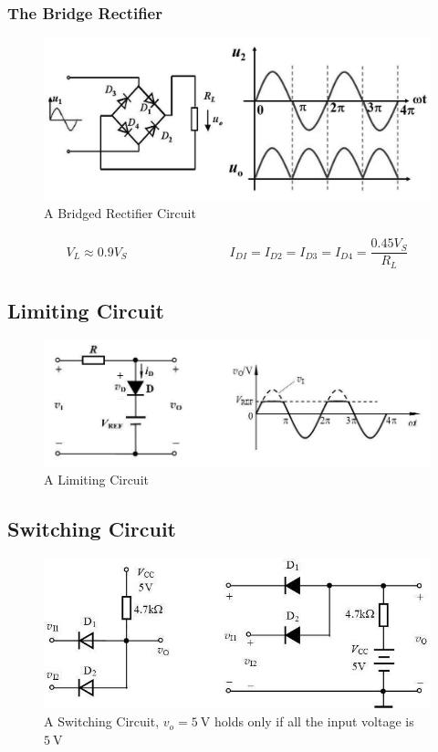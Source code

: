 \subsubsection{The Bridge Rectifier}

\begin{figure}[H]
  \centering
  \includegraphics[width=0.9\linewidth]{figures/BridgedRectifierCircuit}
  \caption{A Bridged Rectifier Circuit}
\end{figure}

\begin{equation*}
  \begin{aligned}
    V_L \approx 0.9 V_S \quad\quad \quad\quad \quad\quad \quad\quad  I_{DI} = I_{D2} = I_{D3} = I_{D4} = \dfrac{0.45 V_S}{R_L} 
  \end{aligned}
\end{equation*}

\subsection{Limiting Circuit}

\begin{figure}[H]
  \centering
  \includegraphics[width=0.8\linewidth]{figures/LimitingCircuit}
  \caption{A Limiting Circuit}
\end{figure}

\subsection{Switching Circuit}

\begin{figure}[H]
  \centering
  \includegraphics[width=0.8\linewidth]{figures/SwitchCircuit}
  \caption{A Switching Circuit, $v_o = 5 \  \mathrm{V}$ holds only if all the input voltage is $5 \  \mathrm{V}$}
\end{figure}

